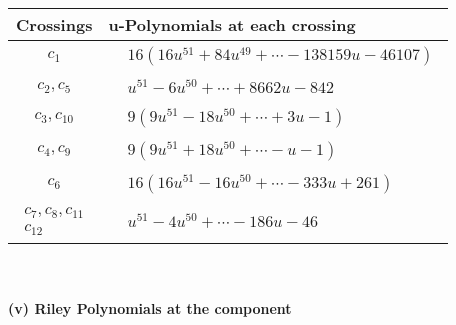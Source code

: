 \documentclass[1p]{elsarticle_modified}
\theoremstyle{definition}
\begin{document}
\begin{tabular}{m{50pt}|m{274pt}}
Crossings & \hspace{64pt}u-Polynomials at each crossing \\
\hline $$\begin{aligned}c_{1}\end{aligned}$$&$\begin{aligned}
&16(16 u^{51}+84 u^{49}+\cdots-138159 u-46107)
\end{aligned}$\\
\hline $$\begin{aligned}c_{2},c_{5}\end{aligned}$$&$\begin{aligned}
&u^{51}-6 u^{50}+\cdots+8662 u-842
\end{aligned}$\\
\hline $$\begin{aligned}c_{3},c_{10}\end{aligned}$$&$\begin{aligned}
&9(9 u^{51}-18 u^{50}+\cdots+3 u-1)
\end{aligned}$\\
\hline $$\begin{aligned}c_{4},c_{9}\end{aligned}$$&$\begin{aligned}
&9(9 u^{51}+18 u^{50}+\cdots- u-1)
\end{aligned}$\\
\hline $$\begin{aligned}c_{6}\end{aligned}$$&$\begin{aligned}
&16(16 u^{51}-16 u^{50}+\cdots-333 u+261)
\end{aligned}$\\
\hline $$\begin{aligned}c_{7},c_{8},c_{11}\\c_{12}\end{aligned}$$&$\begin{aligned}
&u^{51}-4 u^{50}+\cdots-186 u-46
\end{aligned}$\\
\hline
\end{tabular}\\~\\
\newpage\renewcommand{\arraystretch}{1}
\flushleft \textbf{(v) Riley Polynomials at the component}\newline \\
\end{document}
